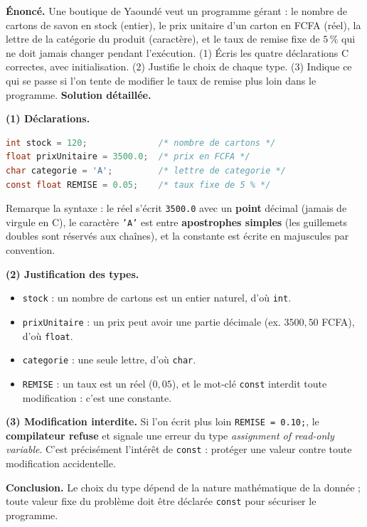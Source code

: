 \documentclass[11pt]{article}
\newcommand{\cle}[1]{{\popxbold\color{popdark}#1}}
\begin{document}
\begin{exoresolu}
\textbf{Énoncé.} Une boutique de Yaoundé veut un programme gérant : le nombre de cartons de savon en stock (entier), le prix unitaire d'un carton en FCFA (réel), la lettre de la catégorie du produit (caractère), et le taux de remise fixe de $5\,\%$ qui ne doit jamais changer pendant l'exécution. (1) Écris les quatre déclarations C correctes, avec initialisation. (2) Justifie le choix de chaque type. (3) Indique ce qui se passe si l'on tente de modifier le taux de remise plus loin dans le programme.
\tcblower
\textbf{Solution détaillée.}

\textbf{(1) Déclarations.}
\begin{lstlisting}[language=C]
int stock = 120;              /* nombre de cartons */
float prixUnitaire = 3500.0;  /* prix en FCFA */
char categorie = 'A';         /* lettre de categorie */
const float REMISE = 0.05;    /* taux fixe de 5 % */
\end{lstlisting}
Remarque la syntaxe : le réel s'écrit \texttt{3500.0} avec un \textbf{point} décimal (jamais de virgule en C), le caractère \texttt{'A'} est entre \textbf{apostrophes simples} (les guillemets doubles sont réservés aux chaînes), et la constante est écrite en majuscules par convention.

\textbf{(2) Justification des types.}
\begin{itemize}
\item \texttt{stock} : un nombre de cartons est un entier naturel, d'où \texttt{int}.
\item \texttt{prixUnitaire} : un prix peut avoir une partie décimale (ex. $3500,50$ FCFA), d'où \texttt{float}.
\item \texttt{categorie} : une seule lettre, d'où \texttt{char}.
\item \texttt{REMISE} : un taux est un réel ($0{,}05$), et le mot-clé \texttt{const} interdit toute modification : c'est une \cle{constante}.
\end{itemize}

\textbf{(3) Modification interdite.} Si l'on écrit plus loin \texttt{REMISE = 0.10;}, le \textbf{compilateur refuse} et signale une erreur du type \emph{assignment of read-only variable}. C'est précisément l'intérêt de \texttt{const} : protéger une valeur contre toute modification accidentelle.

\textbf{Conclusion.} Le choix du type dépend de la nature mathématique de la donnée ; toute valeur fixe du problème doit être déclarée \texttt{const} pour sécuriser le programme.
\end{exoresolu}
\end{document}

